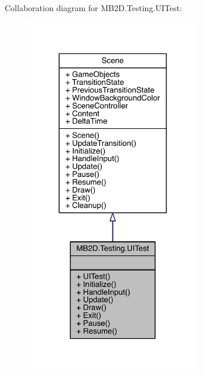 Collaboration diagram for M\+B2\+D.\+Testing.\+U\+I\+Test\+:\nopagebreak
\begin{figure}[H]
\begin{center}
\leavevmode
\includegraphics[width=217pt]{class_m_b2_d_1_1_testing_1_1_u_i_test__coll__graph}
\end{center}
\end{figure}
